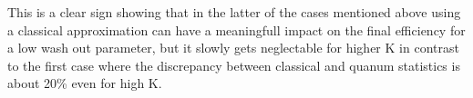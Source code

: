 This is a clear sign showing that in the latter of the cases mentioned above using a classical approximation can have a meaningfull impact on the final efficiency for a low wash out parameter, but it slowly gets neglectable for higher K in contrast to the first case where the discrepancy between classical and quanum statistics is about 20\% even for high K.